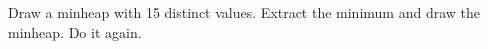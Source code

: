 
  Draw a minheap with 15 distinct values.
  Extract the minimum and draw the minheap.
  Do it again.
